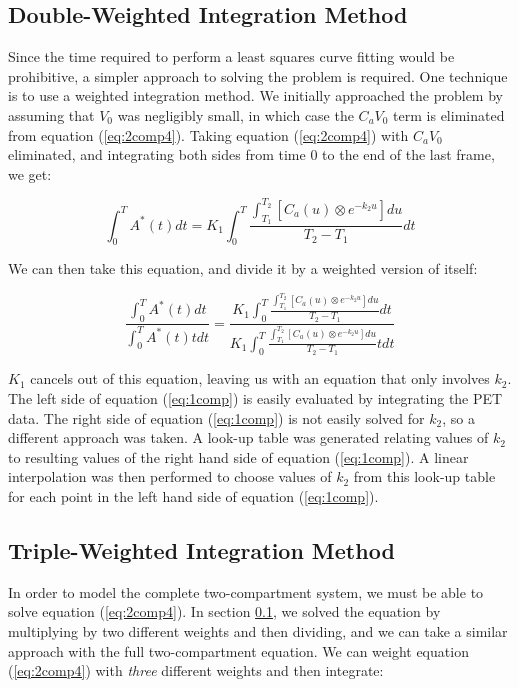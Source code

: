 \subsection{Double-Weighted Integration Method}

\label{sec:double_weight}

Since the time required to perform a least squares curve fitting would
be prohibitive, a simpler approach to solving the problem is required.
One technique is to use a weighted integration method.  We initially
approached the problem by assuming that $V_{0}$ was negligibly small,
in which case the $C_{a}V_{0}$ term is eliminated from equation
(\ref{eq:2comp4}).  Taking equation (\ref{eq:2comp4}) with $C_{a}V_0$
eliminated, and integrating both sides from time 0 to the end of the
last frame, we get:

\begin{equation}
\int_{0}^{T} A^{*}(t) dt = K_{1} \int_{0}^{T} \frac{\int_{T_1}^{T_2}
\left[ C_{a}(u) \otimes e^{-k_{2}u} \right] du}{T_2 - T_1} dt
\end{equation}

We can then take this equation, and divide it by a weighted version
of itself:

\begin{equation}
\frac{\int_{0}^{T} A^{*}(t) dt}{\int_{0}^{T} A^{*}(t) t dt} =
\frac{K_{1} \int_{0}^{T} \frac{\int_{T_1}^{T_2} \left[ C_{a}(u)
\otimes e^{-k_{2}u} \right] du}{T_2 - T_1} dt}{K_{1} \int_{0}^{T}
\frac{\int_{T_1}^{T_2} \left[ C_{a}(u) \otimes e^{-k_{2}u} \right]
du}{T_2 - T_1} t dt}
\label{eq:1comp}
\end{equation}

$K_{1}$ cancels out of this equation, leaving us with an equation
that only involves $k_{2}$.  The left side of equation
(\ref{eq:1comp}) is easily evaluated by integrating the PET data.
The right side of equation (\ref{eq:1comp}) is not easily solved for
$k_{2}$, so a different approach was taken.  A look-up table was
generated relating values of $k_{2}$ to resulting values of the
right hand side of equation (\ref{eq:1comp}).  A linear
interpolation was then performed to choose values of $k_{2}$ from
this look-up table for each point in the left hand side of equation
(\ref{eq:1comp}).


\subsection{Triple-Weighted Integration Method}

In order to model the complete two-compartment system, we must be able
to solve equation (\ref{eq:2comp4}).  In section
\ref{sec:double_weight},
we solved the equation by multiplying by two different weights and
then dividing, and we can take a similar approach with the full
two-compartment equation.  We can weight equation (\ref{eq:2comp4})
with {\em three} different weights and then integrate:

